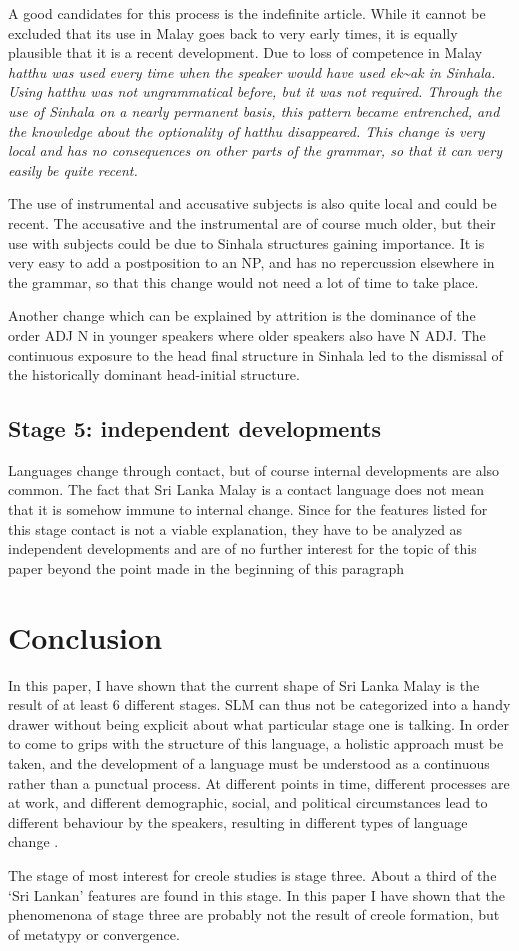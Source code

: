 A good candidates for this process is the indefinite article. While it cannot be excluded that its use in Malay goes back to very early times, it is equally plausible that it is a recent development. Due to loss of competence in Malay \em hatthu \em was used every time when the speaker would have used \em ek\~{}ak \em in Sinhala. Using \em hatthu \em was not ungrammatical before, but it was not required. Through the use of Sinhala on a nearly permanent basis, this pattern became entrenched, and the knowledge about the optionality of \em hatthu \em disappeared. This change is very local and has no consequences on other parts of the grammar, so that it can very easily be quite recent.

The use of instrumental and accusative subjects is also quite local and could be recent. The accusative and the instrumental are of course much older, but their use with subjects could be due to Sinhala structures gaining importance. It is very easy to add a postposition to an NP, and has no repercussion elsewhere in the grammar, so that this change would not need a lot of time to take place.

Another change which can be explained by attrition is the dominance of the order ADJ N in younger speakers where older speakers also have N ADJ. The continuous exposure to the head final structure in Sinhala led to the dismissal of the historically dominant head-initial structure.
 

\subsection{Stage 5: independent developments}
Languages change through contact, but of course internal developments are also common. The fact that Sri Lanka Malay is a contact language does not mean that it is somehow immune to internal change. Since for the features listed for this stage contact is not a viable explanation, they have to be analyzed as independent developments and are of no further interest for the topic of this paper beyond the point made in the beginning of this paragraph

 


\section{Conclusion}
In this paper, I have shown that the current shape of Sri Lanka Malay is the result of at least 6 different stages. SLM can thus not be categorized into a handy drawer without being explicit about what particular stage one is talking. In order to come to grips with the structure of this language, a holistic approach must be taken, and the development of a language must be understood as a continuous rather than a punctual process. At different points in time, different processes are at work, and different demographic, social, and political circumstances lead to different behaviour by the speakers, resulting in different types of language change \citep[cf.][]{Migge1998jpcl,Migge2003,MiggeEtAl2008}.

The stage of most interest for creole studies is stage three. About a third of the `Sri Lankan' features are found in this stage. In this paper I have shown that the phenomenona of stage three are probably not the result of creole formation, but of metatypy or convergence.

